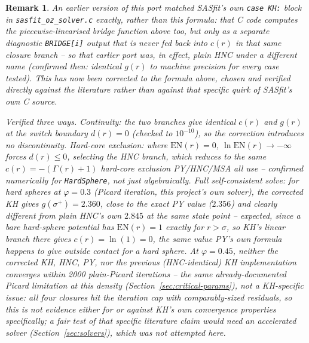 \documentclass[11pt,a4paper]{article}
\newtheorem{remark}{Remark}
\newcommand{\code}[1]{\texttt{#1}}
\begin{document}
\begin{remark}
An earlier version of this port matched SASfit's own \code{case KH:} block
in \code{sasfit\_oz\_solver.c} exactly, rather than this formula: that C
code computes the piecewise-linearised bridge function above too, but only
as a separate diagnostic \code{BRIDGE[i]} output that is never fed back
into $c(r)$ in that same closure branch -- so that earlier port was, in
effect, plain HNC under a different name (confirmed then: identical $g(r)$
to machine precision for every case tested). This has now been corrected to
the formula above, chosen and verified directly against the literature
rather than against that specific quirk of SASfit's own C source.

Verified three ways. \emph{Continuity}: the two branches give identical
$c(r)$ and $g(r)$ at the switch boundary $d(r)=0$ (checked to $10^{-10}$),
so the correction introduces no discontinuity. \emph{Hard-core exclusion}:
where $\mathrm{EN}(r)=0$, $\ln\mathrm{EN}(r)\to-\infty$ forces $d(r)\le0$,
selecting the HNC branch, which reduces to the same $c(r)=-(\Gamma(r)+1)$
hard-core exclusion PY/HNC/MSA all use -- confirmed numerically for
\code{HardSphere}, not just algebraically. \emph{Full self-consistent
solve}: for hard spheres at $\varphi=0.3$ (Picard iteration, this
project's own solver), the corrected KH gives $g(\sigma^+)=2.360$, close to
the exact PY value ($2.356$) and clearly different from plain HNC's own
$2.845$ at the same state point -- expected, since a bare hard-sphere
potential has $\mathrm{EN}(r)=1$ exactly for $r>\sigma$, so KH's linear
branch there gives $c(r)=\ln(1)=0$, the same value PY's own formula happens
to give outside contact for a hard sphere. At $\varphi=0.45$, neither the
corrected KH, HNC, PY, nor the previous (HNC-identical) KH implementation
converges within 2000 plain-Picard iterations -- the same already-documented
Picard limitation at this density (Section~\ref{sec:critical-params}), not
a KH-specific issue: all four closures hit the iteration cap with
comparably-sized residuals, so this is not evidence either for or against
KH's own convergence properties specifically; a fair test of that specific
literature claim would need an accelerated solver
(Section~\ref{sec:solvers}), which was not attempted here.
\end{remark}
\end{document}
